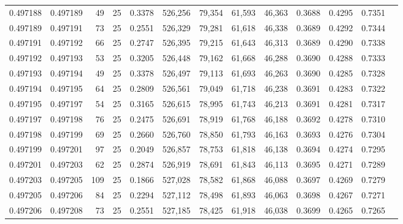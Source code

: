 \begin{tabular}{rrrrrrrrrrrrr}
0.497188 & 0.497189 &    49 &  25 &                                     0.3378 & 526,256 &  79,354 &  61,593 &  46,363 & 0.3688 & 0.4295 & 0.7351 \\
0.497189 & 0.497191 &    73 &  25 &                                     0.2551 & 526,329 &  79,281 &  61,618 &  46,338 & 0.3689 & 0.4292 & 0.7344 \\
0.497191 & 0.497192 &    66 &  25 &                                     0.2747 & 526,395 &  79,215 &  61,643 &  46,313 & 0.3689 & 0.4290 & 0.7338 \\
0.497192 & 0.497193 &    53 &  25 &                                     0.3205 & 526,448 &  79,162 &  61,668 &  46,288 & 0.3690 & 0.4288 & 0.7333 \\
0.497193 & 0.497194 &    49 &  25 &                                     0.3378 & 526,497 &  79,113 &  61,693 &  46,263 & 0.3690 & 0.4285 & 0.7328 \\
0.497194 & 0.497195 &    64 &  25 &                                     0.2809 & 526,561 &  79,049 &  61,718 &  46,238 & 0.3691 & 0.4283 & 0.7322 \\
0.497195 & 0.497197 &    54 &  25 &                                     0.3165 & 526,615 &  78,995 &  61,743 &  46,213 & 0.3691 & 0.4281 & 0.7317 \\
0.497197 & 0.497198 &    76 &  25 &                                     0.2475 & 526,691 &  78,919 &  61,768 &  46,188 & 0.3692 & 0.4278 & 0.7310 \\
0.497198 & 0.497199 &    69 &  25 &                                     0.2660 & 526,760 &  78,850 &  61,793 &  46,163 & 0.3693 & 0.4276 & 0.7304 \\
0.497199 & 0.497201 &    97 &  25 &                                     0.2049 & 526,857 &  78,753 &  61,818 &  46,138 & 0.3694 & 0.4274 & 0.7295 \\
0.497201 & 0.497203 &    62 &  25 &                                     0.2874 & 526,919 &  78,691 &  61,843 &  46,113 & 0.3695 & 0.4271 & 0.7289 \\
0.497203 & 0.497205 &   109 &  25 &                                     0.1866 & 527,028 &  78,582 &  61,868 &  46,088 & 0.3697 & 0.4269 & 0.7279 \\
0.497205 & 0.497206 &    84 &  25 &                                     0.2294 & 527,112 &  78,498 &  61,893 &  46,063 & 0.3698 & 0.4267 & 0.7271 \\
0.497206 & 0.497208 &    73 &  25 &                                     0.2551 & 527,185 &  78,425 &  61,918 &  46,038 & 0.3699 & 0.4265 & 0.7265 \\

\end{tabular}
